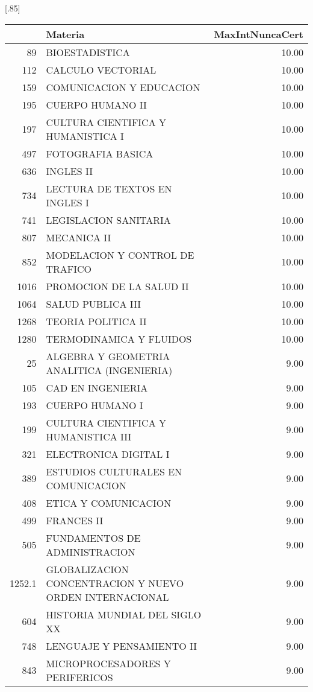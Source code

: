 \documentclass[12pt]{article}
\begin{document}
\begin{table}[ht]
\centering
\scalebox{0.75}[.85]{
\begin{tabular}{rlr}
  \hline
 & Materia & MaxIntNuncaCert \\ 
  \hline

  89 & BIOESTADISTICA & 10.00 \\ 
  112 & CALCULO VECTORIAL & 10.00 \\ 
  159 & COMUNICACION Y EDUCACION & 10.00 \\ 
  195 & CUERPO HUMANO II & 10.00 \\ 
  197 & CULTURA CIENTIFICA Y HUMANISTICA I & 10.00 \\ 
  497 & FOTOGRAFIA BASICA & 10.00 \\ 
  636 & INGLES II & 10.00 \\ 
  734 & LECTURA DE TEXTOS EN INGLES I & 10.00 \\ 
  741 & LEGISLACION SANITARIA & 10.00 \\ 
  807 & MECANICA II & 10.00 \\ 
  852 & MODELACION Y CONTROL DE TRAFICO & 10.00 \\ 
  1016 & PROMOCION DE LA SALUD II & 10.00 \\ 
  1064 & SALUD PUBLICA III & 10.00 \\ 
  1268 & TEORIA POLITICA II & 10.00 \\ 
  1280 & TERMODINAMICA Y FLUIDOS & 10.00 \\ 
  25 & ALGEBRA Y GEOMETRIA ANALITICA (INGENIERIA) & 9.00 \\ 
  105 & CAD EN INGENIERIA & 9.00 \\ 
  193 & CUERPO HUMANO I & 9.00 \\ 
  199 & CULTURA CIENTIFICA Y HUMANISTICA III & 9.00 \\ 
  321 & ELECTRONICA DIGITAL I & 9.00 \\ 
  389 & ESTUDIOS CULTURALES EN COMUNICACION & 9.00 \\ 
  408 & ETICA Y COMUNICACION & 9.00 \\ 
  499 & FRANCES II & 9.00 \\ 
  505 & FUNDAMENTOS DE ADMINISTRACION & 9.00 \\ 
  1252.1 & GLOBALIZACION CONCENTRACION Y NUEVO ORDEN INTERNACIONAL & 9.00 \\ 
  604 & HISTORIA MUNDIAL DEL SIGLO XX & 9.00 \\ 
  748 & LENGUAJE Y PENSAMIENTO II & 9.00 \\ 
  843 & MICROPROCESADORES Y PERIFERICOS & 9.00 \\ 

\end{tabular}}
\end{table}
\end{document}
